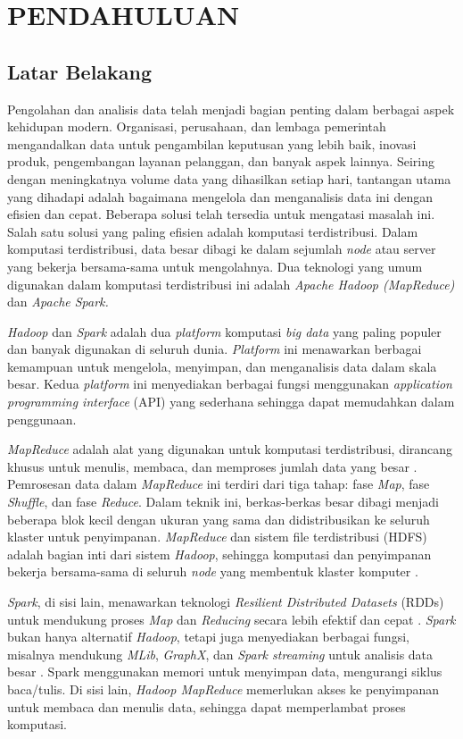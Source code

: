 \chapter{PENDAHULUAN}
\section{Latar Belakang}

Pengolahan dan analisis data telah menjadi bagian penting dalam berbagai aspek kehidupan modern. Organisasi, perusahaan, dan lembaga pemerintah mengandalkan data untuk pengambilan keputusan yang lebih baik, inovasi produk, pengembangan layanan pelanggan, dan banyak aspek lainnya. Seiring dengan meningkatnya volume data yang dihasilkan setiap hari, tantangan utama yang dihadapi adalah bagaimana mengelola dan menganalisis data ini dengan efisien dan cepat. Beberapa solusi telah tersedia untuk mengatasi masalah ini. Salah satu solusi yang paling efisien adalah komputasi terdistribusi. Dalam komputasi terdistribusi, data besar dibagi ke dalam sejumlah \textit{node} atau server yang bekerja bersama-sama untuk mengolahnya. Dua teknologi yang umum digunakan dalam komputasi terdistribusi ini adalah \textit{Apache Hadoop (MapReduce)} dan \textit{Apache Spark.}

\textit{Hadoop} dan \textit{Spark} adalah dua \textit{platform} komputasi \textit{big data} yang paling populer dan banyak digunakan di seluruh dunia. \textit{Platform} ini menawarkan berbagai kemampuan untuk mengelola, menyimpan, dan menganalisis data dalam skala besar. Kedua \textit{platform} ini menyediakan berbagai fungsi menggunakan \textit{application programming interface} (API) yang sederhana sehingga dapat memudahkan dalam penggunaan.

\textit{MapReduce} adalah alat yang digunakan untuk komputasi terdistribusi, dirancang khusus untuk menulis, membaca, dan memproses jumlah data yang besar \cite{deanMapReduceSimplifiedData2004}. Pemrosesan data dalam \textit{MapReduce} ini terdiri dari tiga tahap: fase \textit{Map}, fase \textit{Shuffle}, dan fase \textit{Reduce}. Dalam teknik ini, berkas-berkas besar dibagi menjadi beberapa blok kecil dengan ukuran yang sama dan didistribusikan ke seluruh klaster untuk penyimpanan. \textit{MapReduce} dan sistem file terdistribusi (HDFS) adalah bagian inti dari sistem \textit{Hadoop}, sehingga komputasi dan penyimpanan bekerja bersama-sama di seluruh \textit{node} yang membentuk klaster komputer \cite{samadiComparativeStudyHadoop2016}.

\textit{Spark}, di sisi lain, menawarkan teknologi \textit{Resilient Distributed Datasets} (RDDs) untuk mendukung proses \textit{Map} dan \textit{Reducing} secara lebih efektif dan cepat \cite{ahmadvandGapproxUsingGallup2019}. \textit{Spark} bukan hanya alternatif \textit{Hadoop}, tetapi juga menyediakan berbagai fungsi, misalnya mendukung \textit{MLib}, \textit{GraphX}, dan \textit{Spark streaming }untuk analisis data besar \cite{zahariaSparkClusterComputing2010}. Spark menggunakan memori untuk menyimpan data, mengurangi siklus baca/tulis. Di sisi lain, \textit{Hadoop MapReduce} memerlukan akses ke penyimpanan untuk membaca dan menulis data, sehingga dapat memperlambat proses komputasi.

